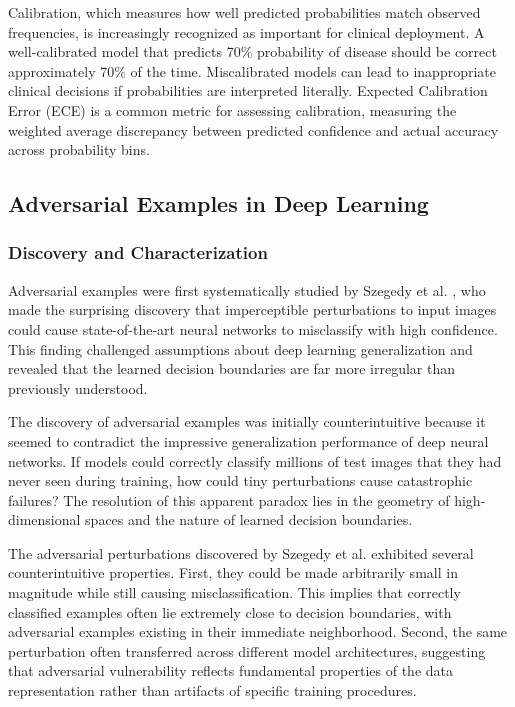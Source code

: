 \documentclass[12pt,a4paper]{article}
\begin{document}
Calibration, which measures how well predicted probabilities match observed frequencies, is increasingly recognized as important for clinical deployment. A well-calibrated model that predicts 70\% probability of disease should be correct approximately 70\% of the time. Miscalibrated models can lead to inappropriate clinical decisions if probabilities are interpreted literally. Expected Calibration Error (ECE) is a common metric for assessing calibration, measuring the weighted average discrepancy between predicted confidence and actual accuracy across probability bins.

\subsection{Adversarial Examples in Deep Learning}

\subsubsection{Discovery and Characterization}

Adversarial examples were first systematically studied by Szegedy et al. \cite{szegedy2014}, who made the surprising discovery that imperceptible perturbations to input images could cause state-of-the-art neural networks to misclassify with high confidence. This finding challenged assumptions about deep learning generalization and revealed that the learned decision boundaries are far more irregular than previously understood.

The discovery of adversarial examples was initially counterintuitive because it seemed to contradict the impressive generalization performance of deep neural networks. If models could correctly classify millions of test images that they had never seen during training, how could tiny perturbations cause catastrophic failures? The resolution of this apparent paradox lies in the geometry of high-dimensional spaces and the nature of learned decision boundaries.

The adversarial perturbations discovered by Szegedy et al. \cite{szegedy2014} exhibited several counterintuitive properties. First, they could be made arbitrarily small in magnitude while still causing misclassification. This implies that correctly classified examples often lie extremely close to decision boundaries, with adversarial examples existing in their immediate neighborhood. Second, the same perturbation often transferred across different model architectures, suggesting that adversarial vulnerability reflects fundamental properties of the data representation rather than artifacts of specific training procedures.
\end{document}
